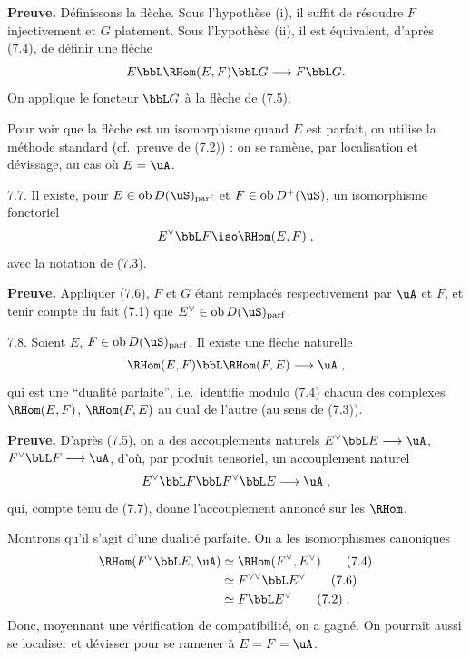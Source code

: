 \noindent\textbf{Preuve.} D\'{e}finissons la fl\`{e}che. Sous l'hypoth\`{e}se (i), il suffit de r\'{e}soudre $F$ injectivement et $G$ platement. Sous l'hypoth\`{e}se (ii), il est \'{e}quivalent, d'apr\`{e}s (7.4), de d\'{e}finir une fl\`{e}che
\[
E \bbL \RHom(E,F) \bbL G \longrightarrow F \bbL G .
\]
On applique le foncteur $\bbL G$ \`{a} la fl\`{e}che de (7.5).

Pour voir que la fl\`{e}che est un isomorphisme quand $E$ est parfait, on utilise la m\'{e}thode standard (cf.~preuve de (7.2)) : on se ram\`{e}ne, par localisation et d\'{e}vissage, au cas o\`{u} $E = \uA$.

\begin{corollaire} 7.7.
Il existe, pour $E \in \operatorname{ob} D(\uS)_{\mathrm{parf}}$ et $F \in \operatorname{ob} D^+(\uS)$, un isomorphisme fonctoriel
\[
E^{\vee} \bbL F \iso \RHom(E,F) \; ,
\]
avec la notation de (7.3).
\end{corollaire}

\noindent\textbf{Preuve.} Appliquer (7.6), $F$ et $G$ \'{e}tant remplac\'{e}s respectivement par $\uA$ et $F$, et tenir compte du fait (7.1) que $E^{\vee} \in \operatorname{ob} D(\uS)_{\mathrm{parf}}$.

\begin{corollaire} 7.8.
Soient $E$, $F \in \operatorname{ob} D(\uS)_{\mathrm{parf}}$. Il existe une fl\`{e}che naturelle
\[
\RHom(E,F) \bbL \RHom(F,E) \longrightarrow \uA \; ,
\]
qui est une ``dualit\'{e} parfaite'', i.e.~identifie modulo (7.4) chacun des complexes $\RHom(E,F)$, $\RHom(F,E)$ au dual de l'autre (au sens de (7.3)).
\end{corollaire}

\noindent\textbf{Preuve.} D'apr\`{e}s (7.5), on a des accouplements naturels $E^{\vee} \bbL E \longrightarrow \uA$, $F^{\vee} \bbL F \longrightarrow \uA$, d'o\`{u}, par produit tensoriel, un accouplement naturel
\[
E^{\vee} \bbL F \bbL F^{\vee} \bbL E \longrightarrow \uA \; ,
\]
qui, compte tenu de (7.7), donne l'accouplement annonc\'{e} sur les $\RHom$.

Montrons qu'il s'agit d'une dualit\'{e} parfaite. On a les isomorphismes canoniques
\begin{align*}
\RHom(F^{\vee} \bbL E, \uA) &\simeq \RHom(F^{\vee}, E^{\vee}) \qquad \text{(7.4)} \\
&\simeq F^{\vee\vee} \bbL E^{\vee} \qquad \text{(7.6)} \\
&\simeq F \bbL E^{\vee} \qquad \text{(7.2)} \; .
\end{align*}
Donc, moyennant une v\'{e}rification de compatibilit\'{e}, on a gagn\'{e}. On pourrait aussi se localiser et d\'{e}visser pour se ramener \`{a} $E = F = \uA$.

